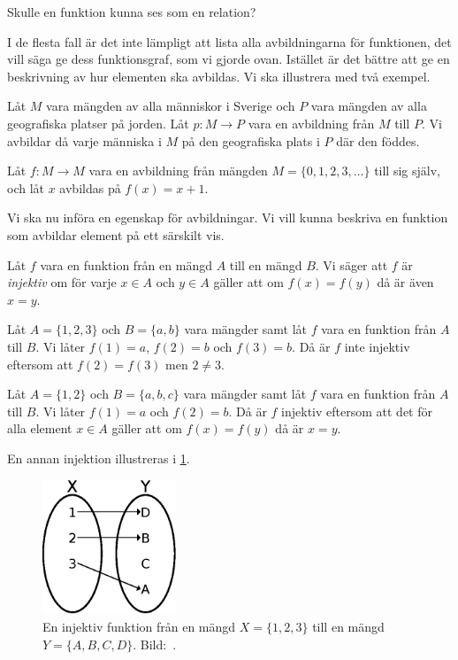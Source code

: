 \begin{exercise}
  Skulle en funktion kunna ses som en relation?
\end{exercise}

I de flesta fall är det inte lämpligt att lista alla avbildningarna för
funktionen, det vill säga ge dess funktionsgraf, som vi gjorde ovan.
Istället är det bättre att ge en beskrivning av hur elementen ska avbildas.
Vi ska illustrera med två exempel.
\begin{example}
  Låt \(M\) vara mängden av alla människor i Sverige och \(P\) vara mängden
  av alla geografiska platser på jorden.
  Låt \(p\colon M\to P\) vara en avbildning från \(M\) till \(P\).
  Vi avbildar då varje människa i \(M\) på den geografiska plats i \(P\) där
  den föddes.
\end{example}
\begin{example}
  Låt \(f\colon M\to M\) vara en avbildning från mängden
  \(M=\{0,1,2,3,\ldots\}\) till sig själv, och låt \(x\) avbildas på
  \(f(x)=x+1\).
\end{example}

Vi ska nu införa en egenskap för avbildningar.
Vi vill kunna beskriva en funktion som avbildar element på ett särskilt vis.
\begin{definition}\label{def:Injektiv}
  Låt \(f\) vara en funktion från en mängd \(A\) till en mängd \(B\).
  Vi säger att \(f\) är \emph{injektiv} om för varje \(x\in A\) och \(y\in
  A\) gäller att om \(f(x)=f(y)\) då är även \(x=y\).
\end{definition}
\begin{example}\label{ex:Surjektiv}
  Låt \(A=\{1,2,3\}\) och \(B=\{a,b\}\) vara mängder samt låt \(f\) vara en
  funktion från \(A\) till \(B\).
  Vi låter \(f(1)=a\), \(f(2)=b\) och \(f(3)=b\).
  Då är \(f\) inte injektiv eftersom att \(f(2)=f(3)\) men \(2\neq 3\).
\end{example}
\begin{example}\label{ex:Injektiv}
  Låt \(A=\{1,2\}\) och \(B=\{a,b,c\}\) vara mängder samt låt \(f\) vara en
  funktion från \(A\) till \(B\).
  Vi låter \(f(1)=a\) och \(f(2)=b\).
  Då är \(f\) injektiv eftersom att det för alla element \(x\in A\) gäller
  att om \(f(x)=f(y)\) då är \(x=y\).
\end{example}

En annan injektion illustreras i \cref{fig:Injektion}.
\begin{figure}
  \includegraphics[width=4cm]{figs/injection.eps}
  \caption{%
    En injektiv funktion från en mängd \(X=\{1,2,3\}\) till en mängd
    \(Y=\{A,B,C,D\}\).
    Bild:~\cite{Wikipedia2013Injection}.
  }\label{fig:Injektion}
\end{figure}

